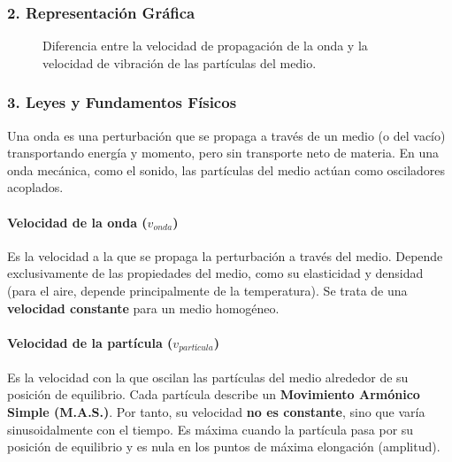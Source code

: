 \subsubsection*{2. Representación Gráfica}
\begin{figure}[H]
    \centering
    \caption{Diferencia entre la velocidad de propagación de la onda y la velocidad de vibración de las partículas del medio.}
\end{figure}

\subsubsection*{3. Leyes y Fundamentos Físicos}
Una onda es una perturbación que se propaga a través de un medio (o del vacío) transportando energía y momento, pero sin transporte neto de materia. En una onda mecánica, como el sonido, las partículas del medio actúan como osciladores acoplados.

\paragraph*{Velocidad de la onda ($v_{onda}$)}
Es la velocidad a la que se propaga la perturbación a través del medio. Depende exclusivamente de las propiedades del medio, como su elasticidad y densidad (para el aire, depende principalmente de la temperatura). Se trata de una \textbf{velocidad constante} para un medio homogéneo.

\paragraph*{Velocidad de la partícula ($v_{partícula}$)}
Es la velocidad con la que oscilan las partículas del medio alrededor de su posición de equilibrio. Cada partícula describe un \textbf{Movimiento Armónico Simple (M.A.S.)}. Por tanto, su velocidad \textbf{no es constante}, sino que varía sinusoidalmente con el tiempo. Es máxima cuando la partícula pasa por su posición de equilibrio y es nula en los puntos de máxima elongación (amplitud).

